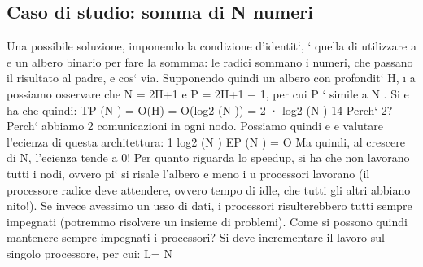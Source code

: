 \documentclass[a4paper,12pt]{article}
\begin{document}
\subsection{Caso di studio: somma di N numeri}
Una possibile soluzione, imponendo la condizione d'identit`, ` quella di utilizzare
a e
un albero binario per fare la sommma: le radici sommano i numeri, che passano
il risultato al padre, e cos` via. Supponendo quindi un albero con profondit` H,
\i{}
a
possiamo osservare che N = 2H+1 e P = 2H+1 $-$ 1, per cui P ` simile a N . Si
e
ha che quindi:
TP (N ) = O(H)
= O(log2 (N ))
= 2 · log2 (N )
14
Perch` 2? Perch` abbiamo 2 comunicazioni in ogni nodo. Possiamo quindi
e
e
valutare l'ecienza di questa architettura:
1
log2 (N )
EP (N ) = O
Ma quindi, al crescere di N, l'ecienza tende a 0! Per quanto riguarda lo speedup, si ha che non lavorano tutti i nodi,
ovvero pi` si risale l'albero e meno i
u
processori lavorano (il processore radice deve attendere, ovvero tempo di idle,
che tutti gli altri abbiano nito!). Se invece avessimo un usso di dati, i processori risulterebbero tutti sempre
impegnati (potremmo risolvere un insieme di
problemi).
Come si possono quindi mantenere sempre impegnati i processori? Si deve
incrementare il lavoro sul singolo processore, per cui:
L=
N
\end{document}
